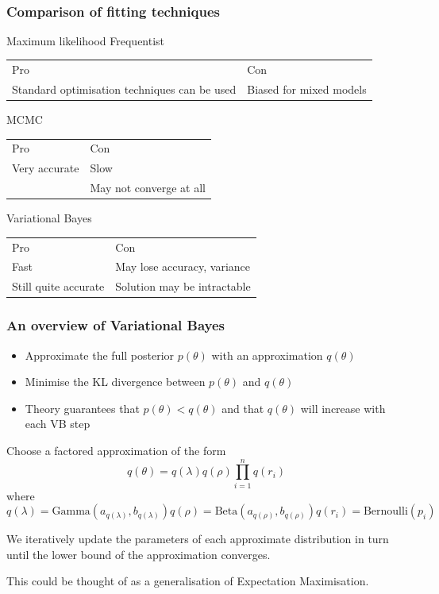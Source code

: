 \documentclass{beamer}
\begin{document}
\
\begin{frame}
\frametitle{Comparison of fitting techniques}
Maximum likelihood
Frequentist
\begin{tabular}{ll}
Pro & Con \\
Standard optimisation techniques can be used & Biased for mixed models
\end{tabular}

MCMC
\begin{tabular}{ll}
Pro & Con \\
Very accurate & Slow \\
& May not converge at all
\end{tabular}

Variational Bayes
\begin{tabular}{ll}
Pro & Con \\
Fast & May lose accuracy, variance \\
Still quite accurate & Solution may be intractable
\end{tabular}

\end{frame}

\begin{frame}
\frametitle{An overview of Variational Bayes}
\begin{itemize}
\item Approximate the full posterior $p(\theta)$ with an approximation $q(\theta)$
\item Minimise the KL divergence between $p(\theta)$ and $q(\theta)$
\item Theory guarantees that $p(\theta) < q(\theta)$ and that $q(\theta)$ will
increase with each VB step
\end{itemize}
\end{frame}

\begin{frame}
Choose a factored approximation of the form
$$
q(\theta) = q(\lambda) q(\rho) \prod_{i=1}^n q(r_i)
$$
where
$$
q(\lambda) = \text{Gamma}(a_{q(\lambda)}, b_{q(\lambda)})
q(\rho) = \text{Beta}(a_{q(\rho)}, b_{q(\rho)})
q(r_i) = \text{Bernoulli}(p_i)
$$

We iteratively update the parameters of each approximate distribution
in turn until the lower bound of the approximation converges.

This could be thought of as a generalisation of Expectation Maximisation.
\end{frame}
\end{document}

